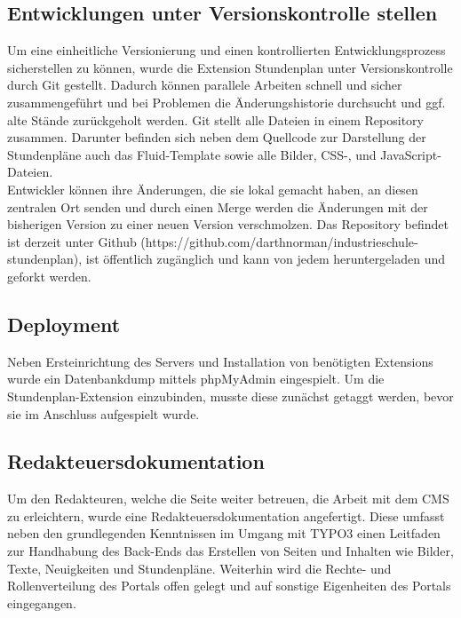 \subsection{Entwicklungen unter Versionskontrolle stellen}
\label{sec:Entwicklungen unter Versionskontrolle stellen}
Um eine einheitliche Versionierung und einen kontrollierten Entwicklungsprozess sicherstellen zu können, wurde die Extension
Stundenplan unter Versionskontrolle durch Git gestellt. Dadurch können parallele Arbeiten schnell und sicher zusammengeführt 
und bei Problemen die Änderungshistorie durchsucht und ggf. alte Stände zurückgeholt werden. Git stellt alle Dateien in einem 
Repository zusammen. Darunter befinden sich neben dem Quellcode zur Darstellung der Stundenpläne auch das Fluid-Template sowie 
alle Bilder, CSS-, und JavaScript-Dateien.\\
Entwickler können ihre Änderungen, die sie lokal gemacht haben, an diesen zentralen Ort senden und durch einen Merge werden 
die Änderungen mit der bisherigen Version zu einer neuen Version verschmolzen. Das Repository befindet ist derzeit unter Github 
(https://github.com/darthnorman/industrieschule-stundenplan), ist öffentlich zugänglich und kann von jedem heruntergeladen 
und geforkt werden.

\subsection{Deployment}
\label{sec:Deployment}
Neben Ersteinrichtung des Servers und Installation von ben\"otigten \acs{Extension}s wurde ein 
\acs{Datenbankdump} mittels phpMyAdmin eingespielt. Um die Stundenplan-\acs{Extension} einzubinden,
musste diese zun\"achst \acs{getaggt} werden, bevor sie im Anschluss aufgespielt wurde.


\subsection{Redakteuersdokumentation}
\label{sec:Redakteuersdokumentation}
Um den Redakteuren, welche die Seite weiter betreuen, die Arbeit mit dem \acs{CMS} zu erleichtern, 
wurde eine Redakteuersdokumentation angefertigt. Diese umfasst neben den grundlegenden Kenntnissen im Umgang mit TYPO3 
einen Leitfaden zur Handhabung des \acs{Back-End}s das Erstellen von Seiten und Inhalten wie Bilder, Texte, Neuigkeiten 
und Stundenpläne. Weiterhin wird die Rechte- und Rollenverteilung des Portals offen gelegt und auf sonstige Eigenheiten 
des Portals eingegangen.
